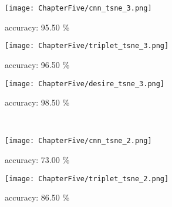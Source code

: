 \begin{figure}[ht!]
    \begin{minipage}[t!]{0.015\textwidth}
    \end{minipage}
    \begin{minipage}[t!]{0.985\textwidth}
        \captionsetup[subfigure]{labelformat=empty}
        \centering
        \begin{subfigure}{0.325\textwidth}
            \centering
            \texttt{[image: ChapterFive/cnn\_tsne\_3.png]}
            \caption{accuracy: 95.50 \%}
        \end{subfigure}
        \hfill
        \begin{subfigure}{0.325\textwidth}
            \centering
            \texttt{[image: ChapterFive/triplet\_tsne\_3.png]}
            \caption{accuracy: 96.50 \%}
        \end{subfigure}
        \hfill
        \begin{subfigure}{0.325\textwidth}
            \centering
            \texttt{[image: ChapterFive/desire\_tsne\_3.png]}
            \caption{accuracy: 98.50 \%}
        \end{subfigure}
    \end{minipage}
    \\ \vspace{0.5 cm}
    \begin{minipage}[t!]{0.015\textwidth}
    \end{minipage}
    \begin{minipage}[t!]{0.985\textwidth}
        \captionsetup[subfigure]{labelformat=empty}
        \begin{subfigure}{0.325\textwidth}
            \centering
            \texttt{[image: ChapterFive/cnn\_tsne\_2.png]}
            \caption{accuracy: 73.00 \%}
        \end{subfigure}
        \hfill
        \begin{subfigure}{0.325\textwidth}
            \centering
            \texttt{[image: ChapterFive/triplet\_tsne\_2.png]}
            \caption{accuracy: 86.50 \%}
        \end{subfigure}
        \hfill
        \begin{subfigure}{0.325\textwidth}

\end{subfigure}
\end{minipage}
\end{figure}
